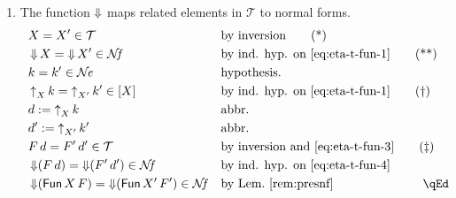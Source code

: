 \documentclass{LMCS}
\theoremstyle{plain}\newtheorem{satz}[thm]{Satz}
\newcommand{\proofLine}[2]{&#1&&\text{#2}}
\newcommand{\Da}[1]{\mathop{\Downarrow} #1}
\newcommand{\upa}[2]{\mathop{\uparrow}\nolimits_{#1}{#2}}
\newcommand{\da}[2]{\mathop{\downarrow}\nolimits_{#1}{#2}}
\newcommand{\perne}{\mathord{\mathcal{N}\!\mathit{e}}}
\newcommand{\pernf}{\mathord{\mathcal{N}\!\mathit{f}}}
\newcommand{\perT}{\mathcal{T}}
\newcommand{\iPi}[2]{\mathsf{Fun}\,#1\,#2}
\begin{document}
{\begin{enumerate}[(a)]
\begin{enumerate}[(1)]
\begin{align*}
        \proofLine{\da{F\ d}{(f\cdot d)} = \da{F'\ d'}{(f'\cdot d')} \in \pernf}{by ind. hyp. on \eqref{eq:mse-fun-4}} \\
        \proofLine{(\da{\iPi X F}{f}) \cdot k = (\da{\iPi{X'}{F'}}{f'})
          \cdot k' \in \pernf}{by def. } \\
        \proofLine{\da{\iPi X F}{f} = \da{\iPi{X'}{F'}}{f'}
          \in \pernf}{by Lem.~\ref{rem:presnf} } \\
      \end{align*}      
    \item The function $\Da$ maps related elements in $\perT$ to normal forms.
      \begin{align*}
        \proofLine{X=X'\in\perT}{by inversion}\tag{*}\label{eq:eta-t-fun-1}\\
        \proofLine{\Da{X}=\Da{X'}\in\pernf}{by ind. hyp. on \eqref{eq:eta-t-fun-1}}\tag{**}\label{eq:eta-t-fun-2}\\
\proofLine{k = k' \in \perne}{hypothesis.}\\
        \proofLine{\upa{X}{k} = \upa{X'}{k'}\in [X]}{by ind. hyp. on \eqref{eq:eta-t-fun-1}}\tag{\textdagger}\label{eq:eta-t-fun-3}\\
        \proofLine{d := \upa{X}{k}}{abbr.}\\
        \proofLine{d' := \upa{X'}{k'}}{abbr.}\\
        \proofLine{F\,d=F'\,d'\in\perT}{by inversion and \eqref{eq:eta-t-fun-3}}\tag{\textdaggerdbl}\label{eq:eta-t-fun-4}\\
        \proofLine{\Da{(F\,d)}=\Da{(F'\,d')}\in\pernf}{by ind. hyp. on \eqref{eq:eta-t-fun-4}}\label{eq:eta-t-fun-5}\\
        \proofLine{\Da{(\iPi X F)} = \Da{(\iPi{X'}{F'})} \in \pernf}{by Lem.~\ref{rem:presnf}}\rlap{\hbox to 93pt{\hfill\qEd}}
\end{align*}
    \end{enumerate}
  \end{enumerate}
}
\end{document}
